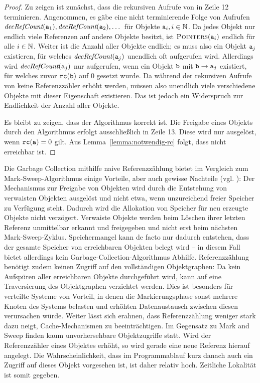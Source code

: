 \begin{proof}
	Zu zeigen ist zunächst, dass die rekursiven Aufrufe von  in Zeile 12 terminieren.
	Angenommen, es gäbe eine nicht terminierende Folge von Aufrufen $\textit{decRefCount}(\texttt{a}_1), \textit{decRefCount}(\texttt{a}_2), \dots$
	für Objekte $\texttt{a}_i, i \in \mathbb{N}$.
	Da jedes Objekt nur endlich viele Referenzen auf andere Objekte besitzt, ist $\textsc{Pointers}(\texttt{a}_i)$ endlich für alle $i \in \mathbb{N}$.
	Weiter ist die Anzahl aller Objekte endlich; es muss also ein Objekt $\texttt{a}_j$ existieren, für welches $\textit{decRefCount}(\texttt{a}_j)$ unendlich oft aufgerufen wird.
	Allerdings wird $\textit{decRefCount}(\texttt{a}_j)$ nur aufgerufen, wenn ein Objekt $\texttt{b}$ mit $\texttt{b} \rightarrow \texttt{a}_j$ existiert, für welches zuvor $\texttt{rc}(\texttt{b})$ auf $0$ gesetzt wurde.
	Da während der rekursiven Aufrufe von  keine Referenzzähler erhöht werden, müssen also unendlich viele verschiedene Objekte  mit dieser Eigenschaft existieren.
	Das ist jedoch ein Widerspruch zur Endlichkeit der Anzahl aller Objekte.
	
	Es bleibt zu zeigen, dass der Algorithmus korrekt ist.
	Die Freigabe eines Objekts  durch den Algorithmus erfolgt ausschließlich in Zeile 13.
	Diese wird nur ausgelöst, wenn $\texttt{rc}(\texttt{a}) = 0$ gilt.
	Aus Lemma~\ref{lemma:notwendig-rc} folgt, dass  nicht erreichbar ist.
\end{proof}

Die Garbage Collection mithilfe naive Referenzzählung bietet im Vergleich zum Mark-Sweep-Algorithmus einige Vorteile, aber auch gewisse Nachteile (vgl. \cite[S. 346]{linhou2006}):
Der Mechanismus zur Freigabe von Objekten wird durch die Entstehung von verwaisten Objekten ausgelöst und nicht etwa, wenn unzureichend freier Speicher zu Verfügung steht.
Dadurch wird die Allokation von Speicher für neu erzeugte Objekte nicht verzögert.
Verwaiste Objekte werden beim Löschen ihrer letzten Referenz unmittelbar erkannt und freigegeben und nicht erst beim nächsten Mark-Sweep-Zyklus.
Speichermangel kann de facto nur dadurch entstehen, dass der gesamte Speicher von erreichbaren Objekten belegt wird -- in diesem Fall bietet allerdings kein Garbage-Collection-Algorithmus Abhilfe.
Referenzzählung benötigt zudem keinen Zugriff auf den vollständigen Objektgraphen:
Da kein Aufspüren aller erreichbaren Objekte durchgeführt wird, kann auf eine Traversierung des Objektgraphen verzichtet werden.
Dies ist besonders für verteilte Systeme von Vorteil, in denen die Markierungsphase sonst mehrere Knoten des Systems belasten und erhöhten Datenaustausch zwischen diesen verursachen würde.
Weiter lässt sich erahnen, dass Referenzzählung weniger stark dazu neigt, Cache-Mechanismen zu beeinträchtigen.
Im Gegensatz zu Mark and Sweep finden kaum unvorhersehbare Objektzugriffe statt.
Wird der Referenzzähler eines Objektes erhöht, so wird gerade eine neue Referenz hierauf angelegt.
Die Wahrscheinlichkeit, dass im Programmablauf kurz danach auch ein Zugriff auf dieses Objekt vorgesehen ist, ist daher relativ hoch.
Zeitliche Lokalität ist somit gegeben.

